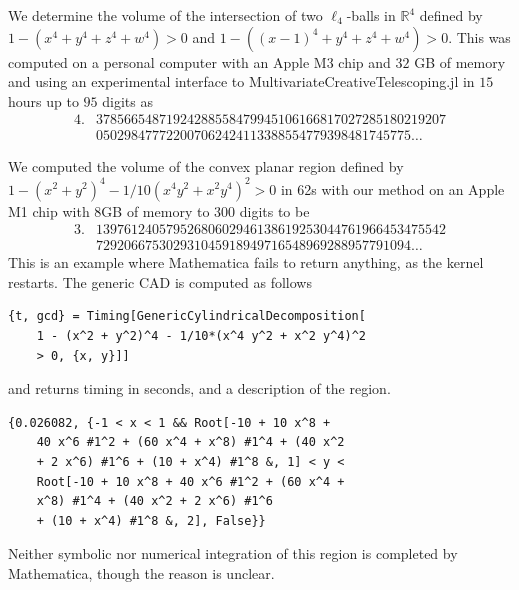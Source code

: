 \documentclass[sigconf, nonacm]{acmart} %
\begin{document}
\begin{example}\label{ex:mathematicaL4L4R4}
    We determine the volume of the intersection of two $\ell_4$-balls in $\mathbb{R}^4$ defined by  $1 - (x^4 + y^4 + z^4 + w^4) > 0$ and $1 - ((x - 1)^4 + y^4 + z^4 + w^4) > 0$. This was computed on a personal computer with an Apple M3 chip and $32$ GB of memory and using an experimental interface to MultivariateCreativeTelescoping.jl in $15$ hours up to $95$ digits as
    \begin{align*} 4.&37856654871924288558479945106166817027285180219207\\&050298477722007062424113388554779398481745775\ldots\,
    \end{align*}
\end{example}

\begin{example}\label{eg:mathematica}
    We computed the volume of the convex planar region defined by $1 - (x^2 + y^2)^4 - 1/10(x^4y^2 + x^2y^4)^2>0$ in 62s with our method on an Apple M1 chip with 8GB of memory to 300 digits to be
    \begin{align*}
    3.&13976124057952680602946138619253044761966453475542\\&729206675302931045918949716548969288957791094\ldots\,
    \end{align*} 
    This is an example where Mathematica \cite{Mathematica14} fails to return anything, as the kernel restarts. The generic CAD is computed as follows 
    \begin{lstlisting}
{t, gcd} = Timing[GenericCylindricalDecomposition[
    1 - (x^2 + y^2)^4 - 1/10*(x^4 y^2 + x^2 y^4)^2 
    > 0, {x, y}]]
    \end{lstlisting}
    and returns timing in seconds, and a description of the region.
    \begin{lstlisting}
{0.026082, {-1 < x < 1 && Root[-10 + 10 x^8 + 
    40 x^6 #1^2 + (60 x^4 + x^8) #1^4 + (40 x^2 
    + 2 x^6) #1^6 + (10 + x^4) #1^8 &, 1] < y < 
    Root[-10 + 10 x^8 + 40 x^6 #1^2 + (60 x^4 + 
    x^8) #1^4 + (40 x^2 + 2 x^6) #1^6 
    + (10 + x^4) #1^8 &, 2], False}}
    \end{lstlisting}
    Neither symbolic nor numerical integration of this region is completed by Mathematica, though the reason is unclear. 
\end{example}
\end{document}
